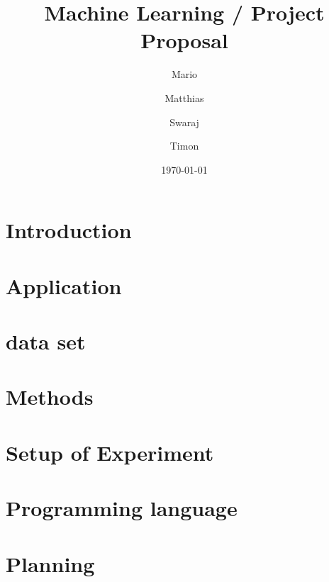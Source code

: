 \documentclass[12pt]{article}
\title{Machine Learning / Project Proposal}
\author{Mario \and Matthias \and Swaraj \and Timon}
\date{\today}
\begin{document}
\maketitle

\section{Introduction}

\section{Application}
    
\section{data set}
    
\section{Methods}
    
\section{Setup of Experiment}
    
\section{Programming language}
    
\section{Planning}
    



\begin{thebibliography}{99}

\end{thebibliography}
\end{document}
